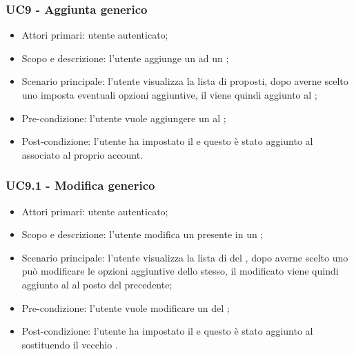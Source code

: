 \subsubsection{UC9 - Aggiunta  generico}
\begin{itemize}
	\item  Attori primari: utente autenticato;
	\item  Scopo e descrizione: l'utente aggiunge un  ad un ;
	\item  Scenario principale: l'utente visualizza la lista di  proposti, dopo averne scelto uno imposta eventuali opzioni aggiuntive, il  viene quindi aggiunto al ;
	\item  Pre-condizione: l'utente vuole aggiungere un  al ;
	\item  Post-condizione: l'utente ha impostato il  e questo è stato aggiunto al  associato al proprio account.
\end{itemize}
\subsubsection{UC9.1 - Modifica  generico}
\begin{itemize}
	\item  Attori primari: utente autenticato;
	\item  Scopo e descrizione: l'utente modifica un  presente in un ;
	\item  Scenario principale: l'utente visualizza la lista di  del , dopo averne scelto uno può modificare le opzioni aggiuntive dello stesso, il  modificato viene quindi aggiunto al  al posto del precedente;
	\item  Pre-condizione: l'utente vuole modificare un  del ;
	\item  Post-condizione: l'utente ha impostato il  e questo è stato aggiunto al  sostituendo il vecchio .
\end{itemize}
